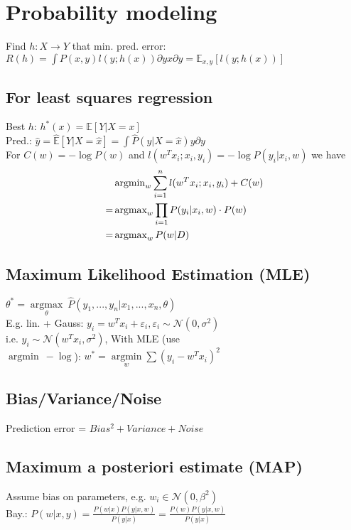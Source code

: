 \section*{Probability modeling}
Find $h:X\rightarrow Y$ that min. pred. error: 
$R(h) = \int P(x,y)l(y;h(x)) \partial yx \partial y = \mathbb{E}_{x,y}[l(y;h(x))]$

\subsection*{For least squares regression}
Best $h$: $h^*(x) = \mathbb{E}[Y|X=x]$ \\
Pred.: $\hat{y} = \hat{\mathbb{E}}[Y|X=\hat{x}] = \int \hat{P}(y|X=\hat{x}) y \partial y$\\
For $C(w) = - \log P(w)$ and $l(w^Tx_i;x_i,y_i) = - \log P(y_i|x_i,w)$ we have 
\begin{align*}
	&\operatorname{argmin}_{w} \sum_{i=1}^{n} l (w^T x_i; x_i,y_i) + C(w)\\ =& \operatorname{argmax}_{w} \prod_{i=1} P(y_i|x_i,w) \cdot P(w) \\=&  \operatorname{argmax}_{w} P(w|D)
\end{align*}

\subsection*{Maximum Likelihood Estimation (MLE)}
$\theta^* = \underset{\theta}{\operatorname{argmax}} ~ \hat{P}(y_1,...,y_n|x_1,...,x_n,\theta)$\\
E.g. lin. + Gauss: $y_i = w^T x_i + \varepsilon_i, \varepsilon_i \sim \mathcal{N}(0, \sigma^2)$\\
i.e. $y_i \sim \mathcal{N}(w^T x_i, \sigma^2)$, With MLE (use\\ $\operatorname{argmin} ~ - \operatorname{log}$): $w^* = \underset{w}{\operatorname{argmin}} \sum (y_i-w^Tx_i)^2$

\subsection*{Bias/Variance/Noise}
Prediction error = $Bias^2 + Variance + Noise$

\subsection*{Maximum a posteriori estimate (MAP)}
Assume bias on parameters, e.g. $w_i \in \mathcal{N}(0, \beta^2)$\\
Bay.: $P(w|x,y) = \frac{P(w|x) P(y|x,w)}{P(y|x)} = \frac{P(w) P(y|x,w)}{P(y|x)}$

